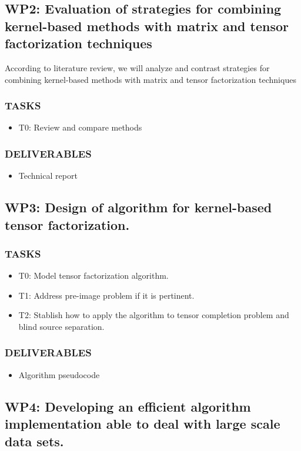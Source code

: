 \documentclass[letterpaper,12pt]{article}
\begin{document}
\subsection*{WP2: Evaluation of strategies for combining kernel-based methods with matrix and tensor factorization techniques}
According to literature review, we will analyze and contrast strategies for combining kernel-based methods with matrix and tensor factorization techniques
\subsubsection*{TASKS}
\begin{itemize}
\item T0: Review and compare methods
\end{itemize}
\subsubsection*{DELIVERABLES}
\begin{itemize}
\item Technical report 
\end{itemize}

\subsection*{WP3: Design of algorithm for kernel-based tensor factorization.}
\subsubsection*{TASKS}
\begin{itemize}
\item T0: Model tensor factorization algorithm.
\item T1: Address pre-image problem if it is pertinent.
\item T2: Stablish how to apply the algorithm to tensor completion problem and blind source separation.
\end{itemize}
\subsubsection*{DELIVERABLES}
\begin{itemize}
 \item Algorithm pseudocode
\end{itemize}


\subsection*{WP4: Developing an efficient algorithm implementation able to deal with large scale data sets.}
\end{document}

